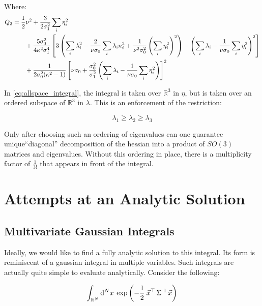 \documentclass[10pt,letterpaper]{article}
\def\half{{1 \over 2}}
\def\d{{\rm d}}  %
\begin{document}
Where:
\begin{equation} \label{eq:Q2}
\begin{split}
Q_2 &= \half \nu^2 + {3 \over 2 \sigma_1^2} \sum_{i} \eta_{i}^2 \nonumber \\
     &\qquad + {5 \sigma_0^2 \over 4 \kappa^2 \sigma_1^4} \left[3
     \left( \sum_i \lambda_i^2 - {2 \over \nu \sigma_0} \sum_i
     \lambda_i  n_i^2 + {1 \over \nu^2 \sigma_0^2} \left(
     \sum_i \eta_i^2 \right)^2\right) - \left(\sum_i
     \lambda_i - {1 \over \nu \sigma_0} \sum_i \eta_i^2
     \right)^2\right] \nonumber \\ 
     &\qquad + {1 \over 2 \sigma_0^2 (\kappa^2 - 1)}
     \left[\nu \sigma_0 + {\sigma_0^2 \over \sigma_1^2}
     \left(\sum_i \lambda_i - {1 \over \nu \sigma_0} \sum_i
     \eta_i^2 \right)\right]^2 \\
\end{split}
\end{equation}


In \ref{eq:allspace_integral}, the integral is taken over $\mathbb{R}^3$ in $\eta$, but is taken over an ordered subspace of $\mathbb{R}^3$ in $\lambda$. This is an enforcement of the restriction:

\begin{equation} \label{eq:ordering}
\lambda_1 \geq \lambda_2 \geq \lambda_3
\end{equation}

Only after choosing such an ordering of eigenvalues can one guarantee unique``diagonal'' decomposition of the hessian into a product of $SO(3)$ matrices and eigenvalues. Without this ordering in place, there is a multiplicity factor of $\frac{1}{3!}$ that appears in front of the integral.

\section{Attempts at an Analytic Solution}

\subsection{Multivariate Gaussian Integrals}

Ideally, we would like to find a fully analytic solution to this integral. Its form is reminiscent of a gaussian integral in multiple variables. Such integrals are actually quite simple to evaluate analytically. Consider the following:

\begin{equation} \label{eq:multigaus}
\int_{\mathbb{R}^N} \d^N x \hspace{0.2pc} \exp \left(-\dfrac{1}{2} \hspace{0.2pc}\vec{x}^\top  \operatorname{\Sigma^{-1}} \vec{x} \right)
\end{equation}
\end{document}
